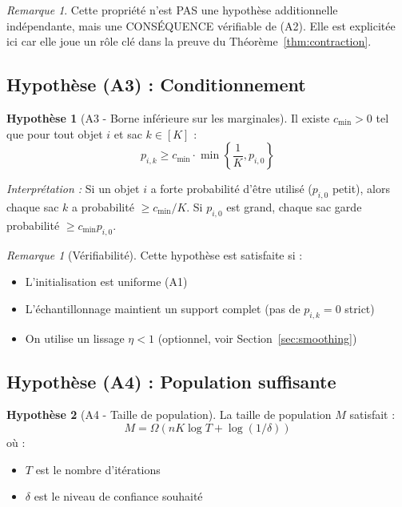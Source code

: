 \documentclass[12pt,a4paper]{article}
\theoremstyle{definition}
\newtheorem{hypothesis}{Hypothèse}
\theoremstyle{remark}
\newtheorem{remark}[theorem]{Remarque}
\begin{document}
\begin{remark}
    Cette propriété n'est PAS une hypothèse additionnelle indépendante, 
    mais une CONSÉQUENCE vérifiable de (A2). Elle est explicitée ici 
    car elle joue un rôle clé dans la preuve du Théorème~\ref{thm:contraction}.
\end{remark}
	
	\subsection{Hypothèse (A3) : Conditionnement}
	
	\begin{hypothesis}[A3 - Borne inférieure sur les marginales]\label{hyp:A3}
    Il existe $c_{\min} > 0$ tel que pour tout objet $i$ et sac $k \in [K]$ :
    \begin{equation}
        p_{i,k} \geq c_{\min} \cdot \min\left\{\frac{1}{K}, p_{i,0}\right\}
    \end{equation}
    
    \emph{Interprétation :} Si un objet $i$ a forte probabilité d'être utilisé 
    ($p_{i,0}$ petit), alors chaque sac $k$ a probabilité $\geq c_{\min}/K$. 
    Si $p_{i,0}$ est grand, chaque sac garde probabilité $\geq c_{\min} p_{i,0}$.
\end{hypothesis}

\begin{remark}[Vérifiabilité]
    Cette hypothèse est satisfaite si :
    \begin{itemize}
        \item L'initialisation est uniforme (A1)
        \item L'échantillonnage maintient un support complet (pas de $p_{i,k} = 0$ strict)
        \item On utilise un lissage $\eta < 1$ (optionnel, voir Section~\ref{sec:smoothing})
    \end{itemize}
\end{remark}
	
	\subsection{Hypothèse (A4) : Population suffisante}
	
	\begin{hypothesis}[A4 - Taille de population]\label{hyp:A4}
		La taille de population $M$ satisfait :
		\begin{equation}
			M = \Omega\left(nK \log T + \log(1/\delta)\right)
		\end{equation}
		où :
		\begin{itemize}
			\item $T$ est le nombre d'itérations
			\item $\delta$ est le niveau de confiance souhaité
		\end{itemize}
	\end{hypothesis}
	
\end{document}
